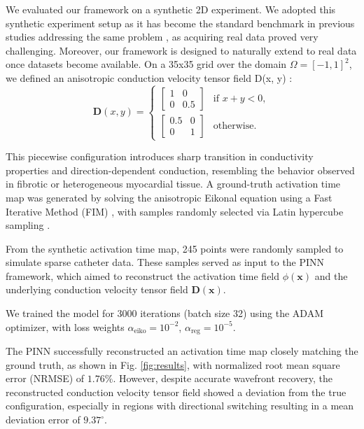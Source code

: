 We evaluated our framework on a synthetic 2D experiment. We adopted this synthetic experiment setup as it has become the standard benchmark in previous studies addressing the same problem \cite{Mase2010, coveney2020, Karoui2021, SahliCostabal2020}, as acquiring real data proved very challenging. Moreover, our framework is designed to naturally extend to real data once datasets become available. On a 35x35 grid over the domain $\Omega = [-1,1]^2$, we defined an anisotropic conduction velocity tensor field D(x, y) \cite{RuizHerrera2022}:
\begin{equation}
\mathbf{D}(x, y) =
\begin{cases}
\begin{bmatrix} 1 & 0 \\ 0 & 0.5 \end{bmatrix} & \text{if } x + y < 0, \\
\begin{bmatrix} 0.5 & 0 \\ 0 & 1 \end{bmatrix} & \text{otherwise.}
\end{cases}
\end{equation}

This piecewise configuration introduces sharp transition in conductivity properties and direction-dependent conduction, resembling the behavior observed in fibrotic or heterogeneous myocardial tissue. A ground-truth activation time map was generated by solving the anisotropic Eikonal equation using a Fast Iterative Method (FIM) \cite{Grandits2021}, with samples randomly selected via Latin hypercube sampling \cite{Stein1987}.

From the synthetic activation time map, 245 points were randomly sampled to simulate sparse catheter data. These samples served as input to the PINN framework, which aimed to reconstruct the activation time field $\phi(\mathbf{x})$ and the underlying conduction velocity tensor field $\mathbf{D}(\mathbf{x})$.

We trained the model for 3000 iterations (batch size 32) using the ADAM optimizer, with loss weights $\alpha_{\text{eiko}} = 10^{-2}$, $\alpha_{\text{reg}} = 10^{-5}$.

The PINN successfully reconstructed an activation time map closely matching the ground truth, as shown in Fig. \ref{fig:results}, with normalized root mean square error (NRMSE) of $1.76\%$. However, despite accurate wavefront recovery, the reconstructed conduction velocity tensor field showed a deviation from the true configuration, especially in regions with directional switching resulting in a mean deviation error of $9.37^\circ$.

